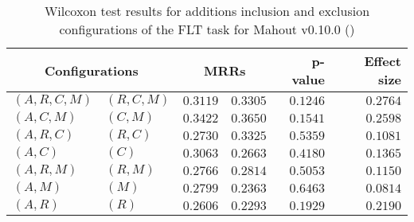 
\begin{table}
\begin{spacing}{1.2}
\centering
\caption{Wilcoxon test results for additions inclusion and exclusion configurations of the FLT task for Mahout v0.10.0 (\ctwo)}
\label{table:versus-wilcox-mahout-flt-additions}
\begin{tabular}{ll|rr|rr}
\toprule
      \multicolumn{2}{c|}{Configurations} &                \multicolumn{2}{c|}{MRRs} &             p-value & Effect size \\
\midrule
 $(A,R,C,M)$ &  $(R,C,M)$ &       $0.3119$ &  $\bm{0.3305}$ & $0.1246$ &    $0.2764$ \\
   $(A,C,M)$ &    $(C,M)$ &       $0.3422$ &  $\bm{0.3650}$ & $0.1541$ &    $0.2598$ \\
   $(A,R,C)$ &    $(R,C)$ &       $0.2730$ &  $\bm{0.3325}$ & $0.5359$ &    $0.1081$ \\
     $(A,C)$ &      $(C)$ &  $\bm{0.3063}$ &       $0.2663$ & $0.4180$ &    $0.1365$ \\
   $(A,R,M)$ &    $(R,M)$ &       $0.2766$ &  $\bm{0.2814}$ & $0.5053$ &    $0.1150$ \\
     $(A,M)$ &      $(M)$ &  $\bm{0.2799}$ &       $0.2363$ & $0.6463$ &    $0.0814$ \\
     $(A,R)$ &      $(R)$ &  $\bm{0.2606}$ &       $0.2293$ & $0.1929$ &    $0.2190$ \\
\bottomrule
\end{tabular}

\end{spacing}
\end{table}


